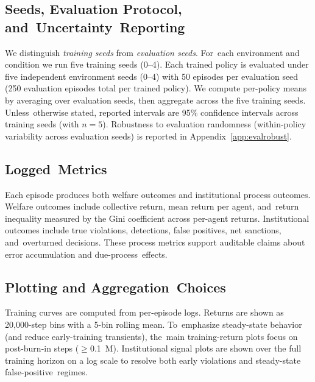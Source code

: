 \documentclass[mca,article,accept,pdftex,oneauthor]{Definitions/mdpi}
\begin{document}
\subsection{Seeds, Evaluation Protocol, and~Uncertainty~Reporting}
We distinguish \emph{training seeds} from \emph{evaluation seeds}. For~each environment and condition we run five training seeds (0--4). Each trained policy is evaluated under five independent environment seeds (0--4) with 50 episodes per evaluation seed (250 evaluation episodes total per trained policy). We compute per-policy means by averaging over evaluation seeds, then aggregate across the five training seeds. Unless~otherwise stated, reported intervals are 95\% confidence intervals across training seeds (with $n=5$). Robustness to evaluation randomness (within-policy variability across evaluation seeds) is reported in Appendix~\ref{app:evalrobust}.

\subsection{Logged~Metrics}
Each episode produces both welfare outcomes and institutional process outcomes. Welfare outcomes include collective return, mean return per agent, and~return inequality measured by the Gini coefficient across per-agent returns. Institutional outcomes include true violations, detections, false positives, net sanctions, and~overturned decisions. These process metrics support auditable claims about error accumulation and due-process~effects.

\subsection{Plotting and Aggregation~Choices}
Training curves are computed from per-episode logs. Returns are shown as 20{,}000-step bins with a 5-bin rolling mean. To~emphasize steady-state behavior (and reduce early-training transients), the~main training-return plots focus on post-burn-in steps (\mbox{$\ge$0.1 M}). Institutional signal plots are shown over the full training horizon on a log scale to resolve both early violations and steady-state false-positive~regimes.


\end{document}
